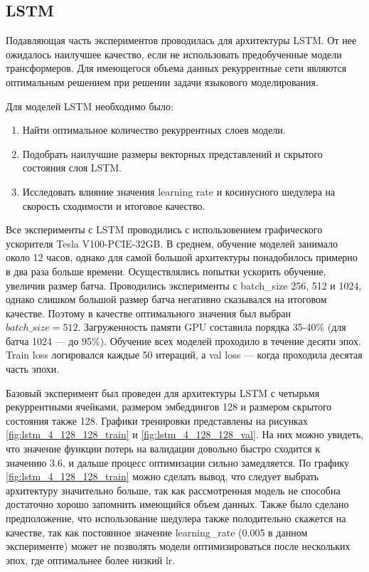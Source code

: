 \subsection{LSTM}

Подавляющая часть экспериментов проводилась для архитектуры LSTM. От нее ожидалось наилучшее качество, если не использовать предобученные модели трансформеров. Для имеющегося объема данных рекуррентные сети являются оптимальным решением при решении задачи языкового моделирования.

Для моделей LSTM необходимо было:

\begin{enumerate}
	\item Найти оптимальное количество рекуррентных слоев модели.
	\item Подобрать наилучшие размеры векторных представлений и скрытого состояния слоя LSTM.
	\item Исследовать влияние значения learning rate и косинусного шедулера на скорость сходимости и итоговое качество.
\end{enumerate}

Все эксперименты с LSTM проводились с использовением графического ускорителя Tesla V100-PCIE-32GB. В среднем, обучение моделей занимало около 12 часов, однако для самой большой архитектуры понадобилось примерно в два раза больше времени. Осуществлялись попытки ускорить обучение, увеличив размер батча. Проводились эксперименты с batch\_size 256, 512 и 1024, однако слишком большой размер батча негативно сказывался на итоговом качестве. Поэтому в качестве оптимального значения был выбран $batch\_size = 512$. Загруженность памяти GPU составила порядка 35-40\% (для батча 1024 --- до 95\%). Обучение всех моделей проходило в течение десяти эпох. Train loss логировался каждые 50 итераций, а val loss --- когда проходила десятая часть эпохи.

Базовый эксперимент был проведен для архитектуры LSTM с четырьмя рекуррентными ячейками, размером эмбеддингов 128 и размером скрытого состояния также 128. Графики тренировки представлены на рисунках \ref{fig:lstm_4_128_128_train} и \ref{fig:lstm_4_128_128_val}. На них можно увидеть, что значение функции потерь на валидации довольно быстро сходится к значению 3.6, и дальше процесс оптимизации сильно замедляется. По графику \ref{fig:lstm_4_128_128_train} можно сделать вывод, что следует выбрать архитектуру значительно больше, так как рассмотренная модель не способна достаточно хорошо запомнить имеющийся объем данных. Также было сделано предположение, что использование шедулера также полодительно скажется на качестве, так как постоянное значение learning\_rate (0.005 в данном эксперименте) может не позволять модели оптимизироваться после нескольких эпох, где оптимальнее более низкий lr.

